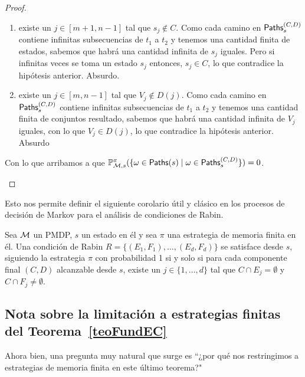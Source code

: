 \begin{proof}
\begin{itemize}
		      \begin{enumerate}
			      \item existe un $j \in [m+1, n-1]$ tal que $s_j \notin C$. Como cada camino en
			            $\textsf{Paths}_s^{(C,D)}$ contiene infinitas subsecuencias de $t_1$ a $t_2$ y tenemos
			            una cantidad finita de estados, sabemos que habrá una cantidad infinita de
			            $s_j$ iguales. Pero si infinitas veces se toma un estado $s_j$ entonces, $s_j
				            \in C$, lo que contradice la hipótesis anterior. Absurdo.

			      \item existe un $j \in [m, n-1]$ tal que $V_j \notin D(j)$. Como cada camino en
			            $\textsf{Paths}_s^{(C,D)}$ contiene infinitas subsecuencias de $t_1$ a $t_2$ y tenemos
			            una cantidad finita de conjuntos resultado, sabemos que habrá una cantidad
			            infinita de $V_j$ iguales, con lo que $V_j \in D(j)$, lo que contradice la
			            hipótesis anterior. Absurdo
		      \end{enumerate}
		      Con lo que arribamos a que $\mathbb{P}^\pi_{\mathcal{M}, s}(\{ \omega \in \textsf{Paths}(s) \mid \omega \in \textsf{Paths}_s^{(C,D)}\}) = 0$.
	\end{itemize}

\end{proof}

Esto nos permite definir el siguiente corolario útil y clásico en los procesos
de decisión de Markov para el análisis de condiciones de Rabin.

\begin{corollary}
	\label{adaptB30}
	Sea $\mathcal{M}$ un PMDP, $s$ un estado en él y sea $\pi$ una estrategia de memoria finita en él. Una condición de Rabin $R = \{ (E_1, F_1), \dots, (E_d, F_d)\}$ se satisface desde $s$, siguiendo la estrategia $\pi$ con probabilidad 1 si y solo si para cada componente final $(C,D)$ alcanzable desde $s$, existe un $j \in \{ 1, \dots, d\}$ tal que $C \cap E_j = \emptyset$ y $C \cap F_j \neq \emptyset$.
\end{corollary}

\subsection*{Nota sobre la limitación a estrategias finitas del Teorema~\ref{teoFundEC}}

Ahora bien, una pregunta muy natural que surge es ``¿por qué nos restringimos a
estrategias de memoria finita en este último teorema?"

